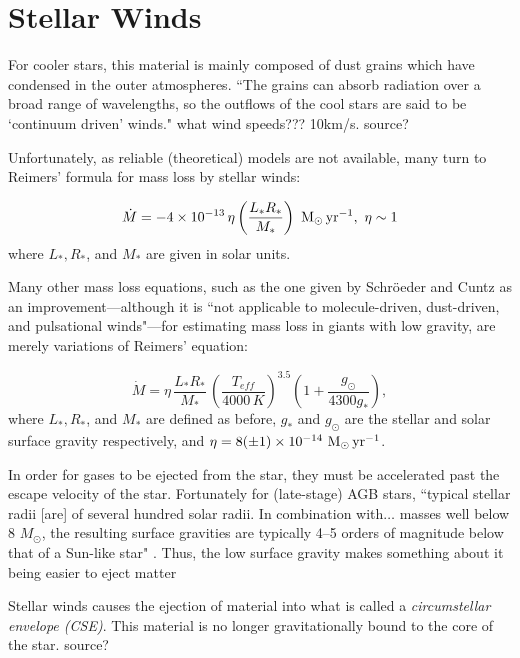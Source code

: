 \documentclass[a4paper,11pt]{article}
\begin{document}
\section{Stellar Winds}

For cooler stars, this material is mainly composed of dust grains which have condensed in the outer atmospheres. ``The grains can absorb radiation over a broad range of wavelengths, so the outflows of the cool stars are said to be ‘continuum driven’ winds." \cite{lamers} {\huge what wind speeds??? 10km/s. source?}

Unfortunately, as reliable (theoretical) models are not available, many turn to Reimers' formula \cite{reimers} for mass loss by stellar winds:

\begin{equation*}
    \dot M = -4\times 10^{-13}\,\eta \left(\frac{L_*R_*}{M_*}\right)~{\rm M_\odot\,yr^{-1}},~{\rm \eta \sim 1}
\end{equation*}
where $L_*, R_*$, and $M_*$ are given in solar units. 

Many other mass loss equations, such as the one given by Schröeder and Cuntz \cite{schroeder} as an improvement—although it is ``not applicable to molecule-driven, dust-driven, and pulsational winds"—for estimating mass loss in giants with low gravity, are merely variations of Reimers' equation:

\begin{equation*}
    \dot M = \eta\,\frac{L_*R_*}{M_*}\,\left(\frac{T_{eff}}{4000\,K}\right)^{3.5}\left(1+\frac{g_\odot}{4300g_*}\right),
\end{equation*}
where $L_*, R_*$, and $M_*$ are defined as before, $g_*$ and $g_\odot$ are the stellar and solar surface gravity respectively, and $\eta = 8 (\pm 1) \times 10^{-14}~{\rm M_\odot\,yr^{-1}}$.


In order for gases to be ejected from the star, they must be accelerated past the escape velocity of the star. Fortunately for (late-stage) AGB stars, ``typical stellar radii [are] of several hundred solar radii. In combination with$\ldots$ masses well below 8 $M_\odot$, the resulting surface gravities are typically 4–5 orders of magnitude below that of a Sun-like star" \cite{hofner}. Thus, the low surface gravity makes {\huge something about it being easier to eject matter}

Stellar winds causes the ejection of material into what is called a \textit{circumstellar envelope (CSE)}. This material is no longer gravitationally bound to the core of the star. {\huge source?}
\end{document}
